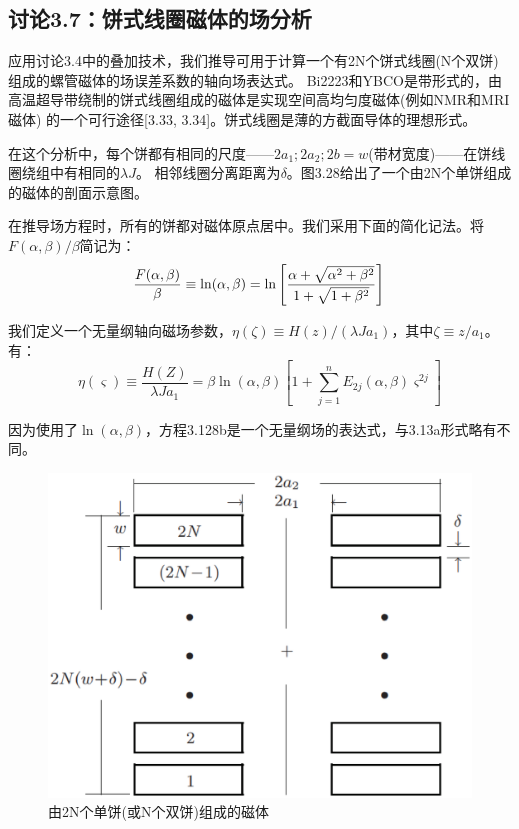 \subsection{讨论3.7：饼式线圈磁体的场分析}
应用讨论3.4中的叠加技术，我们推导可用于计算一个有2N个饼式线圈(N个双饼)组成的螺管磁体的场误差系数的轴向场表达式。
Bi2223和YBCO是带形式的，由高温超导带绕制的饼式线圈组成的磁体是实现空间高均匀度磁体(例如NMR和MRI磁体)
的一个可行途径[3.33, 3.34]。饼式线圈是薄的方截面导体的理想形式。

在这个分析中，每个饼都有相同的尺度——$2a_1;2a_2;2b=w$(带材宽度)——在饼线圈绕组中有相同的$\lambda J$。
相邻线圈分离距离为$\delta$。图3.28给出了一个由2N个单饼组成的磁体的剖面示意图。

在推导场方程时，所有的饼都对磁体原点居中。我们采用下面的简化记法。将$F(\alpha,\beta)/{\beta}$简记为：
\begin{equation}
\frac{F(\alpha,\beta)}{\beta}\equiv \ln(\alpha,\beta)=\ln\left[\frac{\alpha+\sqrt{\alpha^2+\beta^2}}{1+\sqrt{1+\beta^2}}\right]\\%
\end{equation}

我们定义一个无量纲轴向磁场参数，$\eta(\zeta)\equiv H(z)/(\lambda J a_1)$，其中$\zeta\equiv z/a_1$。有：
\begin{equation*}
\eta(\varsigma)\equiv \frac{H(Z)}{\lambda Ja_{1}}=\beta \ln(\alpha,\beta)\left[1+\sum_{j=1}^{n} E_{2j}(\alpha,\beta)\varsigma^{2j}\right]\tag{3.128b}
\end{equation*}

因为使用了$\ln(\alpha,\beta)$，方程3.128b是一个无量纲场的表达式，与3.13a形式略有不同。
\begin{figure}[htbp]
	\centering
	\includegraphics[scale=0.4]{chpt3/figs/fig3.28.eps}
	\caption{由2N个单饼(或N个双饼)组成的磁体}
\end{figure}

